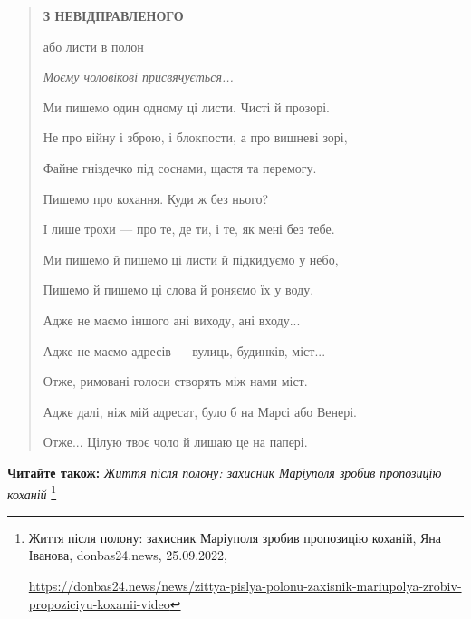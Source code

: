 \begin{quote}
\textbf{З НЕВІДПРАВЛЕНОГО}

або листи в полон

\emph{Моєму чоловікові присвячується...}

Ми пишемо один одному ці листи. Чисті й прозорі.

Не про війну і зброю, і блокпости, а про вишневі зорі,

Файне гніздечко під соснами, щастя та перемогу.

Пишемо про кохання. Куди ж без нього?

І лише трохи — про те, де ти, і те, як мені без тебе.

Ми пишемо й пишемо ці листи й підкидуємо у небо,

Пишемо й пишемо ці слова й роняємо їх у воду.

Адже не маємо іншого ані виходу, ані входу...

Адже не маємо адресів — вулиць, будинків, міст...

Отже, римовані голоси створять між нами міст.

Адже далі, ніж мій адресат, було б на Марсі або Венері.

Отже... Цілую твоє чоло й лишаю це на папері.
\end{quote}

\textbf{Читайте також:} \emph{Життя після полону: захисник Маріуполя зробив пропозицію коханій}%
\footnote{Життя після полону: захисник Маріуполя зробив пропозицію коханій, Яна Іванова, donbas24.news, 25.09.2022, \par%
\url{https://donbas24.news/news/zittya-pislya-polonu-zaxisnik-mariupolya-zrobiv-propoziciyu-koxanii-video}%
}



